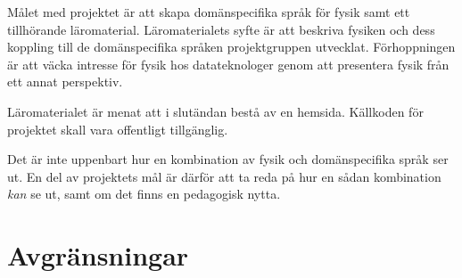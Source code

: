 \begin{draft}

\iffalse
Projekets mål är att skapa ett roligt läromaterial som kombinerar fysik med
tillhörande domänspecika språk. Läromaterialets syfte är att väcka intresse hos läsaren
för fysikaliska samband samt inspirera till vidare studier. De domänspecifika språken är menade att modellera specifikt utvalda
områden inom fysik. Den tillhörande brödtexten är menad att beskriva både de domänspecifika språken, fysiken i sig,    %
samt kopplingen mellan dem.
\fi


Målet med projektet är att skapa domänspecifika språk för fysik samt ett   
tillhörande läromaterial. Läromaterialets syfte är att beskriva fysiken och
dess koppling till de domänspecifika språken projektgruppen utvecklat. Förhoppningen är att väcka intresse
för fysik hos datateknologer genom att presentera fysik från ett annat
perspektiv.

Läromaterialet är menat att i slutändan bestå av en hemsida. Källkoden för projektet
skall vara offentligt tillgänglig.

Det är inte uppenbart hur en kombination av fysik och domänspecifika språk ser ut. En del av projektets mål är därför att ta reda på hur en sådan kombination \textit{kan} se ut, samt om det finns en pedagogisk nytta.


\end{draft}

\section{Avgränsningar}

